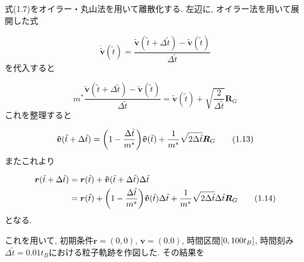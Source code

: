 \documentclass[a4paper,dvipdfmx]{jarticle}
\begin{document}
\newpage


\subsection{}
\noindent
式(1.7)をオイラー・丸山法を用いて離散化する.
左辺に, オイラー法を用いて展開した式

\begin{equation}
    \bm{\dot{\tilde{v}}}(\tilde{t}) 
    = \frac{\bm{\tilde{v}}(\tilde{t}+\Delta \tilde{t})-\bm{\tilde{v}}(\tilde{t})}{\Delta \tilde{t}}
    \tag{1.11}
\end{equation}
を代入すると

\begin{equation}
    m^* \frac{\bm{\tilde{v}}(\tilde{t}+\Delta \tilde{t})-\bm{\tilde{v}}(\tilde{t})}{\Delta \tilde{t}}
    = \bm{\tilde{v}}(\tilde{t}) + \sqrt{\frac{2}{\Delta \tilde{t}}}\bm{R}_G \tag{1.12}
\end{equation}
これを整理すると

\begin{equation}    
    \bm{\tilde{v}}(\tilde{t}+\Delta \tilde{t}) = \qty(1-\frac{\Delta \tilde{t}}{m^*})\bm{\tilde{v}}(\tilde{t})
    + \frac{1}{m^*}\sqrt{2\Delta \tilde{t}}\bm{R}_G  \tag{1.13}
\end{equation}
またこれより

\begin{align*}
    \bm{r}(\tilde{t}+\Delta \tilde{t}) &= \bm{r}(\tilde{t}) + \bm{\tilde{v}}(\tilde{t}+\Delta \tilde{t})\Delta \tilde{t} \\
    &= \bm{r}(\tilde{t}) + \qty(1-\frac{\Delta \tilde{t}}{m^*})\bm{\tilde{v}}(\tilde{t})\Delta \tilde{t}
    + \frac{1}{m^*}\sqrt{2\Delta \tilde{t}}\Delta \tilde{t}\bm{R}_G \tag{1.14}
\end{align*}
となる.

\noindent
これを用いて, 初期条件$\bm{r}=(0,0)$, $\bm{v}=(0.0)$, 時間区間$\qty[0, 100t_B]$, 時間刻み$\Delta \tilde{t}=0.01t_B$における粒子軌跡を作図した.
その結果を



\subsection{}

\noindent


\section{}
\subsection{}
\end{document}
